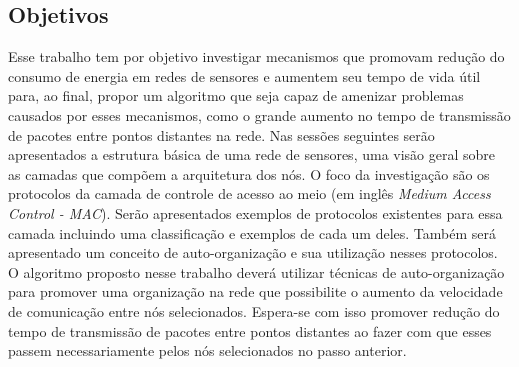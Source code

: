 \subsection{Objetivos}

Esse trabalho tem por objetivo investigar mecanismos que promovam redução do consumo de energia em redes de sensores e aumentem seu tempo de vida útil para, ao final, propor um algoritmo que seja capaz de amenizar problemas causados por esses mecanismos, como o grande aumento no tempo de transmissão de pacotes entre pontos distantes na rede. Nas sessões seguintes serão apresentados a estrutura básica de uma rede de sensores, uma visão geral sobre as camadas que compõem a arquitetura dos nós. O foco da investigação são os protocolos da camada de controle de acesso ao meio (em inglês \emph{Medium Access Control - MAC}). Serão apresentados exemplos de protocolos existentes para essa camada incluindo uma classificação e exemplos de cada um deles. Também será apresentado um conceito de auto-organização e sua utilização nesses protocolos. O algoritmo proposto nesse trabalho deverá utilizar técnicas de auto-organização para promover uma organização na rede que possibilite o aumento da velocidade de comunicação entre nós selecionados. Espera-se com isso promover redução do tempo de transmissão de pacotes entre pontos distantes ao fazer com que esses passem necessariamente pelos nós selecionados no passo anterior. 